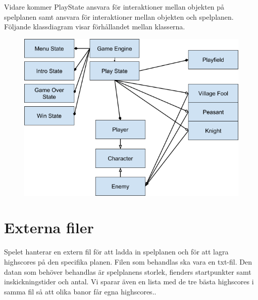 \documentclass{TDP005mall}
\begin{document}
Vidare kommer PlayState ansvara för interaktioner mellan objekten på spelplanen samt ansvara för interaktioner mellan objekten och spelplanen.
\newpage
Följande klassdiagram visar förhållandet mellan klasserna.
\begin{figure}[h!]
    \includegraphics[width=\linewidth]{class_diagram.png}
\end{figure}
\section{Externa filer}
Spelet hanterar en extern fil för att ladda in spelplanen och för att lagra highscores på den specifika planen. 
Filen som behandlas ska vara en txt-fil. 
Den datan som behöver behandlas är spelplanens storlek, fienders startpunkter samt inskickningstider och antal. 
Vi sparar även en lista med de tre bästa highscores i samma fil så att olika banor får egna highscores..  
\end{document}
